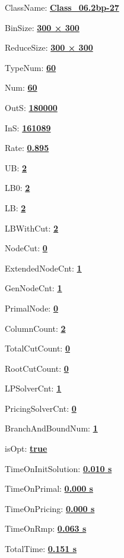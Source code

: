 \documentclass[11pt]{article}
\begin{document}
\pagestyle{empty}


ClassName: \underline{\textbf{Class_06.2bp-27}}
\par
BinSize: \underline{\textbf{300 × 300}}
\par
ReduceSize: \underline{\textbf{300 × 300}}
\par
TypeNum: \underline{\textbf{60}}
\par
Num: \underline{\textbf{60}}
\par
OutS: \underline{\textbf{180000}}
\par
InS: \underline{\textbf{161089}}
\par
Rate: \underline{\textbf{0.895}}
\par
UB: \underline{\textbf{2}}
\par
LB0: \underline{\textbf{2}}
\par
LB: \underline{\textbf{2}}
\par
LBWithCut: \underline{\textbf{2}}
\par
NodeCut: \underline{\textbf{0}}
\par
ExtendedNodeCnt: \underline{\textbf{1}}
\par
GenNodeCnt: \underline{\textbf{1}}
\par
PrimalNode: \underline{\textbf{0}}
\par
ColumnCount: \underline{\textbf{2}}
\par
TotalCutCount: \underline{\textbf{0}}
\par
RootCutCount: \underline{\textbf{0}}
\par
LPSolverCnt: \underline{\textbf{1}}
\par
PricingSolverCnt: \underline{\textbf{0}}
\par
BranchAndBoundNum: \underline{\textbf{1}}
\par
isOpt: \underline{\textbf{true}}
\par
TimeOnInitSolution: \underline{\textbf{0.010 s}}
\par
TimeOnPrimal: \underline{\textbf{0.000 s}}
\par
TimeOnPricing: \underline{\textbf{0.000 s}}
\par
TimeOnRmp: \underline{\textbf{0.063 s}}
\par
TotalTime: \underline{\textbf{0.151 s}}
\par
\newpage
\end{document}
